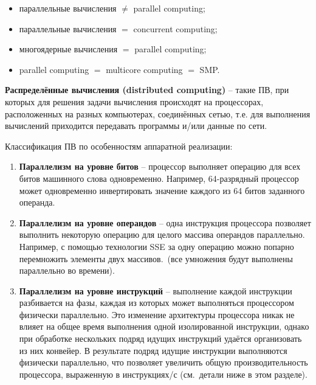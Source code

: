 \begin{itemize}
    \item параллельные вычисления $\neq$ parallel computing;			
    \item параллельные вычисления $=$ concurrent computing;
    \item многоядерные вычисления $=$ parallel computing;
    \item parallel computing $=$ multicore computing $=$ SMP\@.
\end{itemize}

\textbf{Распределённые вычисления (distributed computing)} -- такие ПВ, при которых для решения задачи вычисления происходят на процессорах, расположенных на разных компьютерах, соединённых сетью, т.е. для выполнения вычислений приходится передавать программы и/или данные по сети.

Классификация ПВ по особенностям аппаратной реализации:

\begin{enumerate}
    \sloppy
    \item\textbf{Параллелизм на уровне битов} -- процессор выполняет операцию для всех битов машинного слова одновременно.
    Например, 64-разрядный процессор может одновременно инвертировать значение каждого из 64 битов заданного операнда.
    \item\textbf{Параллелизм на уровне операндов} -- одна инструкция процессора позволяет выполнить некоторую операцию для целого массива операндов параллельно.
    Например, с помощью технологии SSE за одну операцию можно попарно перемножить элементы двух массивов.\ (все умножения будут выполнены параллельно во времени).
    \item\textbf{Параллелизм на уровне инструкций} -- выполнение каждой инструкции разбивается на фазы, каждая из которых может выполняться процессором физически параллельно.
    Это изменение архитектуры процессора никак не влияет на общее время выполнения одной изолированной инструкции, однако при обработке нескольких подряд идущих инструкций удаётся организовать из них конвейер.
    В результате подряд идущие инструкции выполняются физически параллельно, что позволяет увеличить общую производительность процессора, выраженную в инструкциях/с (см.\ детали ниже в этом разделе).
\end{enumerate}


